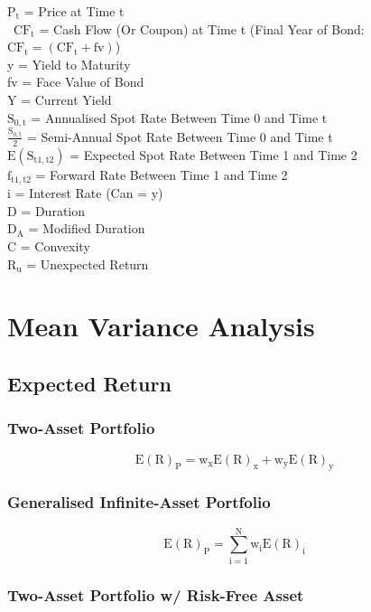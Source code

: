\documentclass[11pt, english]{article}
\begin{document}
$\mathrm{P_t}$ = Price at Time t\\\
$\mathrm{CF_t}$ = Cash Flow (Or Coupon) at Time t (Final Year of Bond: $\mathrm{CF_t=(CF_t+fv)}$)\\
y = Yield to Maturity\\
fv = Face Value of Bond\\
Y = Current Yield\\
$\mathrm{S_{0,t}}$ = Annualised Spot Rate Between Time 0 and Time t\\
$\mathrm{\frac{S_{0,t}}{2}}$ = Semi-Annual Spot Rate Between Time 0 and Time t\\
$\mathrm{E(S_{t1,t2})}$ = Expected Spot Rate Between Time 1 and Time 2\\
$\mathrm{f_{t1,t2}}$ = Forward Rate Between Time 1 and Time 2\\
i = Interest Rate (Can = y)\\
D = Duration\\
$\mathrm{D_A}$ = Modified Duration\\
C = Convexity\\
$\mathrm{R_u}$ = Unexpected Return

\newpage

\section{Mean Variance Analysis}

	\subsection{Expected Return} 

		\subsubsection{Two-Asset Portfolio}

	$$\mathrm{E(R)_P=w_xE(R)_x+w_yE(R)_y}$$

		\subsubsection{Generalised Infinite-Asset Portfolio}

	$$\mathrm{E(R)_P=\sum_{i=1}^Nw_iE(R)_i}$$

		\subsubsection{Two-Asset Portfolio w/ Risk-Free Asset}
\end{document}
